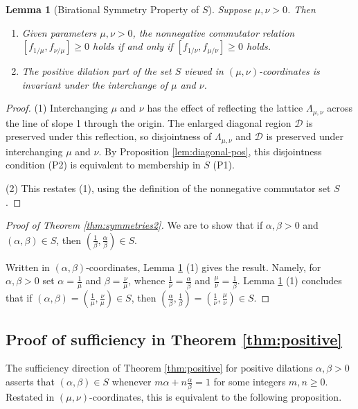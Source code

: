 \documentclass[11pt, letterpaper, reqno]{amsart}
\newtheorem{lem}[thm]{Lemma}
\theoremstyle{definition}
\numberwithin{equation}{section}
\newcommand{\um}{{\mu}}
\newcommand{\vm}{{\nu}}
\newcommand{\cD}{\mathcal{D}}
\begin{document}
{%
\begin{lem}[Birational  Symmetry Property of $S$]
\label{lem:symm-prop}
Suppose $\um, \vm >0$. Then 
\begin{enumerate}
\item Given parameters $\um,\vm>0$,  the nonnegative commutator relation 
$[f_{1/\um}, f_{\vm/\um}] \geq 0 $ holds
if and only if $ [f_{1/\vm}, f_{\um/\vm}] \geq 0$ holds.

\item The positive dilation part of the set $S$ viewed in $(\um,\vm)$-coordinates is invariant under the interchange of $\um$ and $\vm$.
\end{enumerate}
\end{lem}

\begin{proof}
(1) Interchanging $\um$ and $\vm$ has the effect of reflecting the lattice 
$\Lambda_{\um,\vm}$ across the line of slope 1 through the origin. The enlarged diagonal region $\cD$ is preserved under this reflection, so disjointness of 
$\Lambda_{\um,\vm}$ and $\cD$ is preserved under interchanging $\um$ and $\vm$.
By Proposition \ref{lem:diagonal-pos}, this disjointness condition (P2) is equivalent to membership in $S$ (P1).

(2) This restates (1), using the definition of the nonnegative commutator set $S$. 
\end{proof}

\begin{proof}[Proof of Theorem \ref{thm:symmetries2}]
We are to show that if $\alpha, \beta >0$ and $(\alpha,\beta)\in S$, then $(\frac1\beta, \frac{\alpha}{\beta}) \in S$.

Written in  $(\alpha, \beta)$-coordinates,   Lemma  \ref{lem:symm-prop}  (1) gives the result. 
Namely, for  $\alpha, \beta >0$  set
  $\alpha= \frac{1}{\um}$ and  $\beta= \frac{\vm}{\um}$, 
whence  $\frac{1}{\vm} = \frac{\alpha}{\beta}$ and $\frac{\um}{\vm} = \frac{1}{\beta}$.
Lemma  \ref{lem:symm-prop}  (1) concludes that
if   $(\alpha, \beta) = (\frac{1}{\um},  \frac{\vm}{\um}) \in S$, 
then $(\frac{\alpha}{\beta} , \frac{1}{\beta}) = (\frac{1}{\vm}, \frac{\um}{\vm}) \in S$.
\end{proof}

%
%
\subsection{Proof of sufficiency in Theorem \ref{thm:positive}}
\label{subsec:pos-sufficient}
The  sufficiency  direction of Theorem \ref{thm:positive} for positive dilations $\alpha, \beta>0$
asserts that  $(\alpha, \beta) \in S$  
whenever $m\alpha + n \frac{\alpha}{\beta} =1$ for some integers $m, n \ge 0$.
Restated in $(\um, \vm)$-coordinates, this is equivalent to the following proposition.

}
\end{document}
